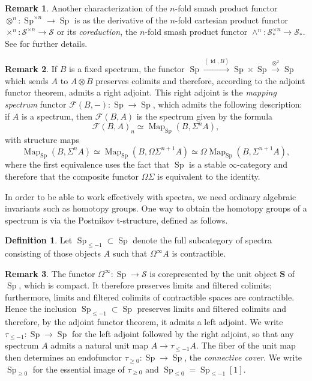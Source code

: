 \documentclass{article}
\theoremstyle{definition}
\newtheorem{definition}{Definition}[subsection]
\newtheorem{remark}{Remark}[subsection]
\newcommand{\F}{\mathcal{F}}
\renewcommand{\S}{\mathcal{S}}
\renewcommand{\SS}{\mathbf{S}}
\renewcommand{\i}{\infty}
\newcommand{\too}{\longrightarrow}
\DeclareMathOperator{\id}{id}
\DeclareMathOperator{\Map}{Map}
\DeclareMathOperator{\Sp}{Sp}
\begin{document}
\begin{remark}
Another characterization of the $n$-fold smash product functor $\otimes^n:\Sp^{\times n}\to\Sp$ is as the derivative of the $n$-fold cartesian product functor $\times^n:\S^{\times n}\to\S$ or its {\em coreduction}, the $n$-fold smash product functor $\land^n:\S_*^{\times n}\to\S_*$.
See \cite[Example 6.2.3.28]{HA} for further details.
\end{remark}

\begin{remark}
If $B$ is a fixed spectrum, the functor
$
\Sp\overset{(\id,B)}\too\Sp\times\Sp\overset{\otimes^2}\too\Sp
$
which sends $A$ to $A\otimes B$ preserves colimits and therefore, according to the adjoint functor theorem, admits a right adjoint.
This right adjoint is the {\em mapping spectrum} functor $\F(B,-):\Sp\to\Sp$, which admits the following description: if $A$ is a spectrum, then $\F(B,A)$ is the spectrum given by the formula
\[
\F(B,A)_n\simeq\Map_{\Sp}(B,\Sigma^n A),
\]
with structure maps
\[
\Map_{\Sp}(B,\Sigma^n A)\simeq\Map_{\Sp}(B,\Omega\Sigma^{n+1}A)\simeq\Omega\Map_{\Sp}(B,\Sigma^{n+1}A),
\]
where the first equivalence uses the fact that $\Sp$ is a stable $\i$-category and therefore that the composite functor $\Omega\Sigma$ is equivalent to the identity.
\end{remark}


In order to be able to work effectively with spectra, we need ordinary algebraic invariants such as homotopy groups.
One way to obtain the homotopy groups of a spectrum is via the Postnikov t-structure, defined as follows.
\begin{definition}
Let $\Sp_{\leq -1}\subset\Sp$ denote the full subcategory of spectra consisting of those objects $A$ such that $\Omega^\infty A$ is contractible.
\end{definition}

\begin{remark}
The functor $\Omega^\infty\colon\Sp\to\S$ is corepresented by the unit object $\SS$ of $\Sp$, which is compact.
It therefore preserves limits and filtered colimits; furthermore, limits and filtered colimits of contractible spaces are contractible.
Hence the inclusion $\Sp_{\leq -1}\subset\Sp$ preserves limits and filtered colimits and therefore, by the adjoint functor theorem, it admits a left adjoint.
We write $\tau_{\leq -1}\colon\Sp\to\Sp$ for the left adjoint followed by the right adjoint, so that any spectrum $A$ admits a natural unit map $A\to\tau_{\leq -1} A$.
The fiber of the unit map then determines an endofunctor $\tau_{\geq 0}:\Sp\to\Sp$, the {\em connective cover}.
We write $\Sp_{\geq 0}$ for the essential image of $\tau_{\geq 0}$ and $\Sp_{\leq 0}=\Sp_{\leq -1}[1]$.
\end{remark}
\end{document}
